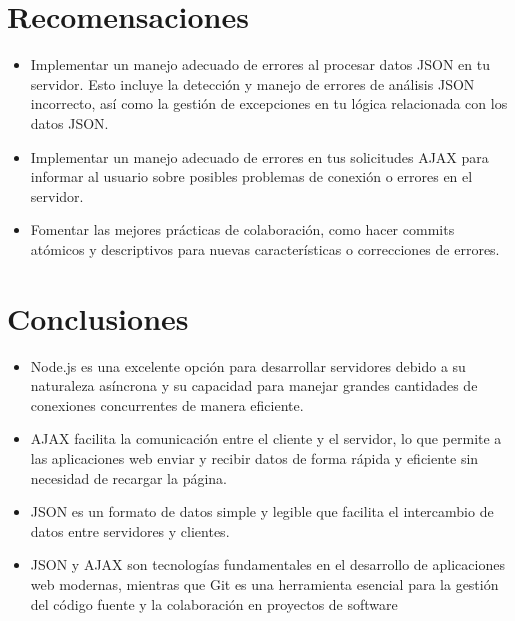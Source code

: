 \documentclass{article}
\begin{document}
  \section{Recomensaciones}
  \begin{itemize}
    \item Implementar un manejo adecuado de errores al procesar datos JSON en tu servidor. Esto incluye la detección y 
      manejo de errores de análisis JSON incorrecto, así como la gestión de excepciones en tu lógica relacionada 
      con los datos JSON.
    \item Implementar un manejo adecuado de errores en tus solicitudes AJAX para informar al usuario sobre 
      posibles problemas de conexión o errores en el servidor.
    \item Fomentar las mejores prácticas de colaboración, como hacer commits atómicos y descriptivos para nuevas 
      características o correcciones de errores.
  \end{itemize}


  \section{Conclusiones}
  \begin{itemize}
    \item Node.js es una excelente opción para desarrollar servidores debido a su naturaleza asíncrona y su capacidad 
      para manejar grandes cantidades de conexiones concurrentes de manera eficiente.
    \item AJAX facilita la comunicación entre el cliente y el servidor, lo que permite a las aplicaciones web enviar 
      y recibir datos de forma rápida y eficiente sin necesidad de recargar la página.
    \item JSON es un formato de datos simple y legible que facilita el intercambio de datos entre servidores y clientes.
    \item JSON y AJAX son tecnologías fundamentales en el desarrollo de aplicaciones web modernas, 
      mientras que Git es una herramienta esencial para la gestión del código fuente y la colaboración en proyectos de software
  \end{itemize}

	\newpage
\end{document}
